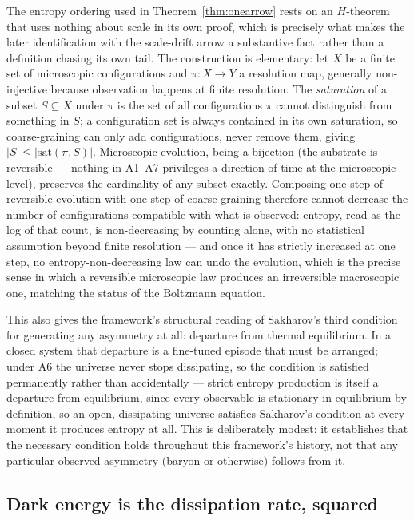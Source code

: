 \documentclass[aps,prd,twocolumn,superscriptaddress,nofootinbib]{revtex4-2}
\begin{document}
The entropy ordering used in Theorem~\ref{thm:onearrow} rests on an
$H$-theorem that uses nothing about scale in its own proof, which is
precisely what makes the later identification with the scale-drift
arrow a substantive fact rather than a definition chasing its own tail.
The construction is elementary: let $X$ be a finite set of
microscopic configurations and $\pi:X\to Y$ a resolution map, generally
non-injective because observation happens at finite resolution. The
\emph{saturation} of a subset $S\subseteq X$ under $\pi$ is the set of
all configurations $\pi$ cannot distinguish from something in $S$; a
configuration set is always contained in its own saturation, so
coarse-graining can only add configurations, never remove them, giving
$|S|\le|\mathrm{sat}(\pi,S)|$. Microscopic evolution, being a bijection
(the substrate is reversible — nothing in A1–A7 privileges a direction of
time at the microscopic level), preserves the cardinality of any subset
exactly. Composing one step of reversible evolution with one step of
coarse-graining therefore cannot decrease the number of configurations
compatible with what is observed: entropy, read as the log of that
count, is non-decreasing by counting alone, with no statistical
assumption beyond finite resolution — and once it has strictly increased
at one step, no entropy-non-decreasing law can undo the evolution,
which is the precise sense in which a reversible microscopic law
produces an irreversible macroscopic one, matching the status of the
Boltzmann equation.

This also gives the framework's structural reading of Sakharov's third
condition for generating any asymmetry at all: departure from thermal
equilibrium. In a closed system that departure is a fine-tuned episode
that must be arranged; under A6 the universe never stops dissipating,
so the condition is satisfied permanently rather than accidentally —
strict entropy production is itself a departure from equilibrium, since
every observable is stationary in equilibrium by definition, so an open,
dissipating universe satisfies Sakharov's condition at every moment it
produces entropy at all. This is deliberately modest: it establishes
that the necessary condition holds throughout this framework's history,
not that any particular observed asymmetry (baryon or otherwise) follows
from it.

\subsection{Dark energy is the dissipation rate, squared}
\end{document}
